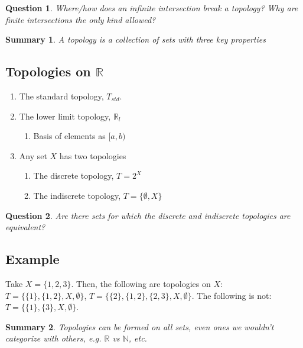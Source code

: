 \documentclass[11pt]{article}
\newtheorem{question}{Question}[section]
\newtheorem{summary}{Summary}[section]
\begin{document}
\begin{question}


Where/how does an infinite intersection break a topology? Why are
finite intersections the only kind allowed? 
\end{question}
\begin{summary}


A topology is a collection of sets with three key properties
\end{summary}

\subsection{Topologies on \(\mathbb{R}\)}
\label{sec:org0b1ef43}
\begin{enumerate}
\item The standard topology, \(T_{std}\).
\item The lower limit topology, \(\mathbb{R}_l\)
\begin{enumerate}
\item Basis of elements as \([a,b)\)
\end{enumerate}
\item Any set \(X\) has two topologies
\begin{enumerate}
\item The discrete topology, \(T = 2^X\)
\item The indiscrete topology, \(T = \{\emptyset, X\}\)
\end{enumerate}
\end{enumerate}


\begin{question}


Are there sets for which the discrete and indiscrete topologies are
equivalent?
\end{question}

\subsection{Example}
\label{sec:orga81d598}
Take \(X = \{1,2,3\}\). Then, the following are topologies on \(X\): \(T =
\{\{1\},\{1,2\},X,\emptyset\}\), \(T =
\{\{2\},\{1,2\},\{2,3\},X,\emptyset\}\). The following is not: \(T =
\{\{1\},\{3\},X,\emptyset\}\).

\begin{summary}


Topologies can be formed on all sets, even ones we wouldn't categorize
with others, e.g. \(\mathbb{R}\) vs \(\mathbb{N}\), etc.
\end{summary}
\end{document}
